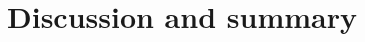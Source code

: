 \documentclass[pdftex,twocolumn,epjc3]{svjour3}          %
\begin{document}
\section{Discussion and summary}

\begin{acknowledgements}
\end{acknowledgements}







\end{document}
